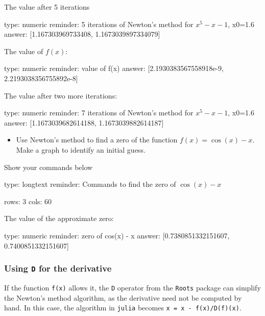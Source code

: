 \documentclass[12pt]{article}
\begin{document}
The value after 5 iterations

\begin{answer}
    type: numeric
    reminder: 5 iterations of Newton's method for \( x^5 -x - 1 \), x0=1.6
    answer: [1.167303969733408, 1.1673039897334079]

\end{answer}

The value of $f(x)$:

\begin{answer}
    type: numeric
    reminder: value of f(x)
    answer: [2.1930383567558918e-9, 2.2193038356755892e-8]

\end{answer}

The value after two more iterations:

\begin{answer}
    type: numeric
    reminder: 7 iterations of Newton's method for \( x^5 -x - 1 \), x0=1.6
    answer: [1.1673039682614188, 1.1673039882614187]

\end{answer}

\begin{itemize}
\itemsep1pt\parskip0pt
\item
  Use Newton's method to find a zero of the function
  $f(x) = \cos(x) -   x$. Make a graph to identify an initial guess.
\end{itemize}

Show your commands below

\begin{answer}
type: longtext
reminder: Commands to find the zero of \( \cos(x) -x \)

rows: 3
cols: 60
\end{answer}

The value of the approximate zero:

\begin{answer}
    type: numeric
    reminder: zero of cos(x) - x
    answer: [0.7380851332151607, 0.7400851332151607]

\end{answer}

\subsubsection{Using \texttt{D} for the derivative}

If the function \texttt{f(x)} allows it, the \texttt{D} operator from
the \texttt{Roots} package can simplify the Newton's method algorithm,
as the derivative need not be computed by hand. In this case, the
algorithm in \texttt{julia} becomes \texttt{x = x - f(x)/D(f)(x)}.
\end{document}

